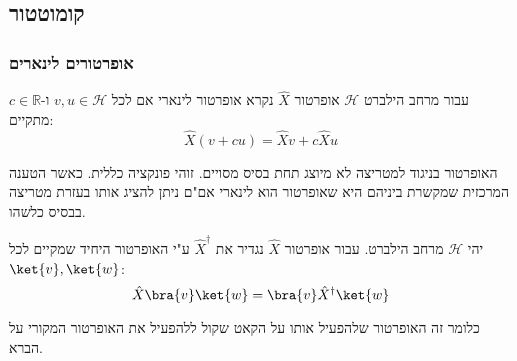 \documentclass{tstextbook}
\begin{document}
\subsection{קומוטטור}

\subsubsection{אופרטורים לינארים}

\begin{definition}
עבור מרחב הילברט \(\mathcal{H}\) אופרטור \(\hat{X}\) נקרא אופרטור לינארי אם לכל \(v,u \in \mathcal{H}\) ו-\(c \in \mathbb{R}\) מתקיים:
$$\hat{X}(v+cu)=\hat{X}v+c\hat{X}u$$

\end{definition}
האופרטור בניגוד למטריצה לא מיוצג תחת בסיס מסויים. זוהי פונקציה כללית. כאשר הטענה המרכזית שמקשרת ביניהם היא שאופרטור הוא לינארי אם"ם ניתן להציג אותו בעזרת מטריצה בבסיס כלשהו.

\begin{definition}
יהי \(\mathcal{H}\) מרחב הילברט. עבור אופרטור \(\hat{X}\) נגדיר את \(\hat{X}^{\dagger}\) ע"י האופרטור היחיד שמקיים לכל \(\ket{v},\ket{w}\):
$$\hat{X}\bra{v} \ket{w} =\bra{v} \hat{X}^{\dagger}\ket{w} $$

\end{definition}
כלומר זה האופרטור שלהפעיל אותו  על הקאט שקול ללהפעיל את האופרטור המקורי על הברא.
\end{document}
